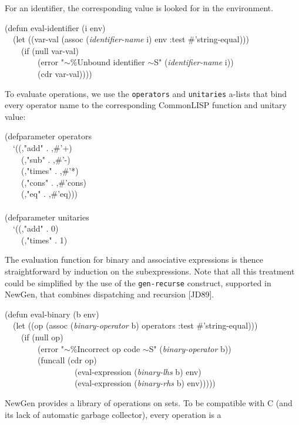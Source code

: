 For an identifier, the corresponding value is looked for in the
environment. 
\begin{pgm}
(defun eval-identifier (i env) \\
~~(let ((var-val (assoc ({\sl identifier-name} i) env :test
                                        \#'string-equal))) \\
~~~~(if (null var-val) \\
~~~~~~~~(error "$\sim$\%Unbound identifier $\sim$S" ({\sl identifier-name} i)) \\
~~~~~~~~(cdr var-val))))
\end{pgm}
To evaluate operations, we use the {\tt operators} and {\tt unitaries}
a-lists that bind every operator name to the corresponding CommonLISP
function and unitary value:
\begin{pgm}
(defparameter operators \\
~~`((,"add" . ,\#'+) \\
~~~~(,"sub" . ,\#'-) \\
~~~~(,"times" . ,\#'*) \\
~~~~(,"cons" . ,\#'cons) \\
~~~~(,"eq" . ,\#'eq))) \\
 \\
(defparameter unitaries \\
~~`((,"add" . 0) \\
~~~~(,"times" . 1) 
\end{pgm}
The evaluation function for binary and associative expressions is thence
straightforward by induction on the subexpressions. Note that all this
treatment could be simplified by the use of the {\tt gen-recurse}
construct, supported in NewGen, that combines dispatching and recursion
[JD89].
\begin{pgm}
(defun eval-binary (b env) \\
~~(let ((op (assoc ({\sl binary-operator} b) operators 
                        :test \#'string-equal))) \\
~~~~(if (null op) \\
~~~~~~~~(error "$\sim$\%Incorrect op code $\sim$S" ({\sl binary-operator} b)) \\
~~~~~~~~(funcall (cdr op) \\
~~~~~~~~~~~~~~~~~(eval-expression ({\sl binary-lhs} b) env) \\
~~~~~~~~~~~~~~~~~(eval-expression ({\sl binary-rhs} b) env))))) 
\end{pgm}
NewGen provides a library of operations on sets. To be compatible with C
(and its lack of automatic garbage collector), every operation is a
